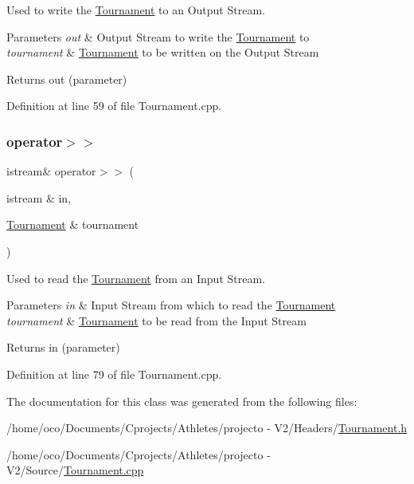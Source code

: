 Used to write the \hyperlink{class_tournament}{Tournament} to an Output Stream. 


\begin{DoxyParams}{Parameters}
{\em out} & Output Stream to write the \hyperlink{class_tournament}{Tournament} to \\
\hline
{\em tournament} & \hyperlink{class_tournament}{Tournament} to be written on the Output Stream \\
\hline
\end{DoxyParams}
\begin{DoxyReturn}{Returns}
out (parameter) 
\end{DoxyReturn}


Definition at line 59 of file Tournament.\+cpp.

\hypertarget{class_tournament_a35e43e0ee6981515ba4442efa8cac7a7}{}\label{class_tournament_a35e43e0ee6981515ba4442efa8cac7a7} 
\subsubsection{\texorpdfstring{operator$>$$>$}{operator>>}}
{\footnotesize\ttfamily istream\& operator$>$$>$ (\begin{DoxyParamCaption}\item[{istream \&}]{in,  }\item[{\hyperlink{class_tournament}{Tournament} \&}]{tournament }\end{DoxyParamCaption})\hspace{0.3cm}{\ttfamily [friend]}}



Used to read the \hyperlink{class_tournament}{Tournament} from an Input Stream. 


\begin{DoxyParams}{Parameters}
{\em in} & Input Stream from which to read the \hyperlink{class_tournament}{Tournament} \\
\hline
{\em tournament} & \hyperlink{class_tournament}{Tournament} to be read from the Input Stream \\
\hline
\end{DoxyParams}
\begin{DoxyReturn}{Returns}
in (parameter) 
\end{DoxyReturn}


Definition at line 79 of file Tournament.\+cpp.



The documentation for this class was generated from the following files\+:\begin{DoxyCompactItemize}
\item 
/home/oco/\+Documents/\+Cprojects/\+Athletes/projecto -\/ V2/\+Headers/\hyperlink{_tournament_8h}{Tournament.\+h}\item 
/home/oco/\+Documents/\+Cprojects/\+Athletes/projecto -\/ V2/\+Source/\hyperlink{_tournament_8cpp}{Tournament.\+cpp}\end{DoxyCompactItemize}
